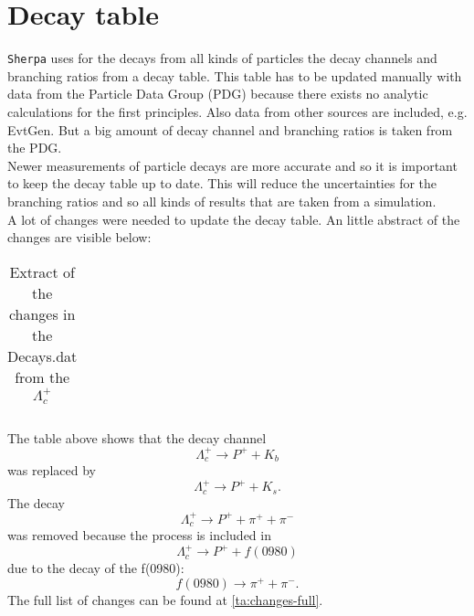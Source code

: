 \section{Decay table}
\texttt{Sherpa} uses for the decays from all kinds of particles the decay channels 
and branching ratios from a decay table. This table has to be 
updated manually with data from the Particle Data Group (PDG) because there 
exists no analytic calculations for the first principles. Also data from other 
sources are included, e.g. EvtGen. But a big amount of decay channel and 
branching ratios is taken from the PDG{\cite{lambda-pdg}}.\\
Newer measurements of particle decays are more accurate and so it is important 
to keep the decay table up to date. This will reduce the uncertainties for the 
branching ratios and so all kinds of results that are taken from a simulation.\\
A lot of changes were needed to update the decay table. An little abstract of 
the changes are visible below:
\begin{longtable}{| c | c | c |}
  \caption{Extract of the changes in the Decays.dat from the \(\Lambda_c^+\)}\label{ta:changes-decays}\\ 
  \hline
  
\end{longtable}
The table above shows that the decay channel
\begin{equation}
  \Lambda_c^+ \rightarrow P^+ + K_b \nonumber
\end{equation}
was replaced by
\begin{equation}
  \Lambda_c^+ \rightarrow P^+ + K_s.  \nonumber
\end{equation}
The decay
\begin{equation}
  \Lambda_c^+ \rightarrow P^+ + \pi^+ + \pi^- \nonumber
\end{equation}
was removed because the process is included in
\begin{equation}
  \Lambda_c^+ \rightarrow P^+ + f(0980) \nonumber
\end{equation}
due to the decay of the f(0980):
\begin{equation}
  f(0980) \rightarrow \pi^+ + \pi^-. \nonumber
\end{equation}
The full list of changes can be found at {\ref{ta:changes-full}}.

